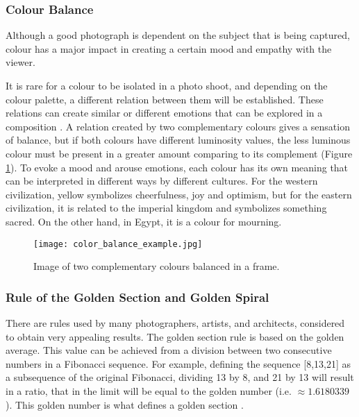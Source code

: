 \subsubsection{Colour Balance}
\label{subsub:colour_balance}

Although a good photograph is dependent on the subject that is being captured, colour has a major impact in creating a certain mood and empathy with the viewer. 

It is rare for a colour to be isolated in a photo shoot, and depending on the colour palette, a different relation between them will be established. These relations can create similar or different emotions that can be explored in a composition \cite{Santos}.
A relation created by two complementary colours gives a sensation of balance, but if both colours have different luminosity values, the less luminous colour must be present in a greater amount comparing to its complement (Figure \ref{fig:colour_balance_image}).
To evoke a mood and arouse emotions, each colour has its own meaning that can be interpreted in different ways by different cultures. For the western civilization, yellow symbolizes cheerfulness, joy and optimism, but for the eastern civilization, it is related to the imperial kingdom and symbolizes something sacred. On the other hand, in Egypt, it is a colour for mourning.

\begin{figure}[htbp]
    \centering
	\label{fig:colour_balance_example}
    \texttt{[image: color\_balance\_example.jpg]}
  \caption{Image of two complementary colours balanced in a frame. \cite{Santos}}
  \label{fig:colour_balance_image}
\end{figure}

\subsubsection{Rule of the Golden Section and Golden Spiral}
\label{subsub:golden_section}

There are rules used by many photographers, artists, and architects, considered to obtain very appealing results. The golden section rule is based on the golden average. This value can be achieved from a division between two consecutive numbers in a Fibonacci sequence. For example, defining the sequence [8,13,21] as a subsequence of the original Fibonacci, dividing 13 by 8, and 21 by 13 will result in a ratio, that in the limit will be equal to the golden number (i.e. $\approx 1.6180339$). This golden number is what defines a golden section \cite{Santos}. 

